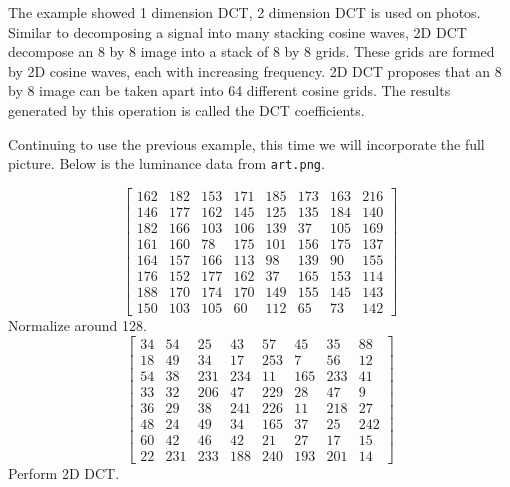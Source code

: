 \documentclass{article}
\begin{document}
The example showed 1 dimension DCT, 2 dimension DCT is used on photos.
Similar to decomposing a signal into many stacking cosine waves, 2D DCT decompose an 8 by 8 image into a stack of 8 by 8 grids.
These grids are formed by 2D cosine waves, each with increasing frequency.
2D DCT proposes that an 8 by 8 image can be taken apart into 64 different cosine grids.
The results generated by this operation is called the DCT coefficients.

Continuing to use the previous example, this time we will incorporate the full picture.
Below is the luminance data from \texttt{art.png}.

\begin{equation*}
\begin{bmatrix}
	162 & 182 & 153 & 171 & 185 & 173 & 163 & 216 \\
	146 & 177 & 162 & 145 & 125 & 135 & 184 & 140 \\
	182 & 166 & 103 & 106 & 139 &  37 & 105 & 169 \\
	161 & 160 &  78 & 175 & 101 & 156 & 175 & 137 \\
	164 & 157 & 166 & 113 &  98 & 139 &  90 & 155 \\
	176 & 152 & 177 & 162 &  37 & 165 & 153 & 114 \\
	188 & 170 & 174 & 170 & 149 & 155 & 145 & 143 \\
	150 & 103 & 105 &  60 & 112 &  65 &  73 & 142
\end{bmatrix}
\end{equation*}
Normalize around 128.
\begin{equation*}
\begin{bmatrix}
	34 &  54 &  25 &  43 &  57 &  45 &  35 &  88 \\
	18 &  49 &  34 &  17 & 253 &   7 &  56 &  12 \\
	54 &  38 & 231 & 234 &  11 & 165 & 233 &  41 \\
	33 &  32 & 206 &  47 & 229 &  28 &  47 &   9 \\
	36 &  29 &  38 & 241 & 226 &  11 & 218 &  27 \\
	48 &  24 &  49 &  34 & 165 &  37 &  25 & 242 \\
	60 &  42 &  46 &  42 &  21 &  27 &  17 &  15 \\
	22 & 231 & 233 & 188 & 240 & 193 & 201 &  14
\end{bmatrix}
\end{equation*}
Perform 2D DCT.
\end{document}
